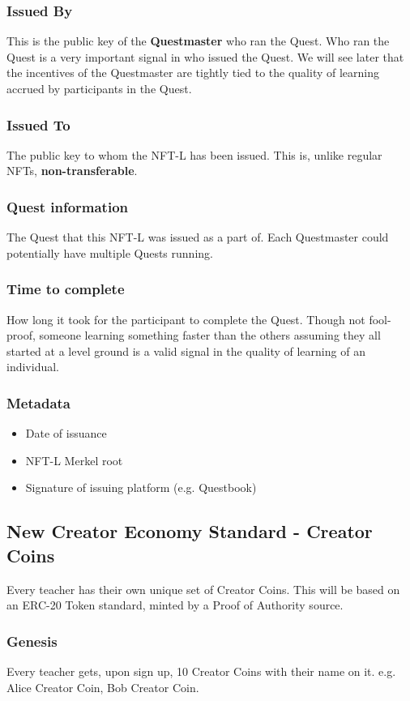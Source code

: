 \documentclass{article}
\begin{document}
      \subsubsection{Issued By}
        This is the public key of the \textbf{Questmaster} who ran the Quest. Who ran the Quest is a very important signal in who issued the Quest. We will see later that the incentives of the Questmaster are tightly tied to the quality of learning accrued by participants in the Quest. 
      \subsubsection{Issued To}
        The public key to whom the NFT-L has been issued. This is, unlike regular NFTs, \textbf{non-transferable}. 
      \subsubsection{Quest information}
        The Quest that this NFT-L was issued as a part of. Each Questmaster could potentially have multiple Quests running. 
      \subsubsection{Time to complete}
        How long it took for the participant to complete the Quest. Though not fool-proof, someone learning something faster than the others assuming they all started at a level ground is a valid signal in the quality of learning of an individual. 
      \subsubsection{Metadata}
        \begin{itemize}
          \item Date of issuance
          \item NFT-L Merkel root
          \item Signature of issuing platform (e.g. Questbook)
        \end{itemize}
    \subsection{New Creator Economy Standard - Creator Coins}
      Every teacher has their own unique set of Creator Coins. This will be based on an ERC-20 Token standard, minted by a Proof of Authority source.
      \subsubsection{Genesis}
        Every teacher gets, upon sign up, 10 Creator Coins with their name on it. e.g. Alice Creator Coin, Bob Creator Coin.
\end{document}
